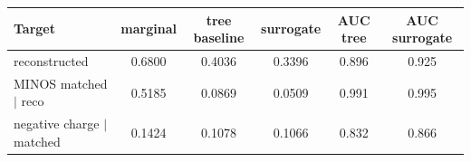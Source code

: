 \begin{tabular}{lccccc}
\toprule
Target & marginal & tree baseline & surrogate & AUC tree & AUC surrogate \\
\midrule
reconstructed & 0.6800 & 0.4036 & 0.3396 & 0.896 & 0.925 \\
MINOS matched $\mid$ reco & 0.5185 & 0.0869 & 0.0509 & 0.991 & 0.995 \\
negative charge $\mid$ matched & 0.1424 & 0.1078 & 0.1066 & 0.832 & 0.866 \\
\bottomrule
\end{tabular}
